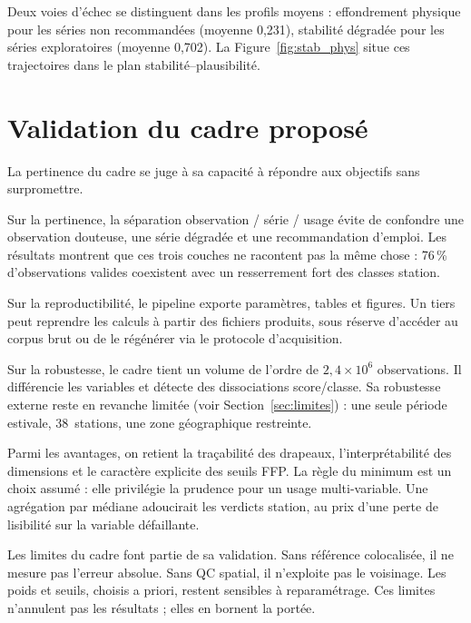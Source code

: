 Deux voies d'échec se distinguent dans les profils moyens : effondrement
physique pour les séries non recommandées (moyenne 0,231), stabilité dégradée
pour les séries exploratoires (moyenne 0,702). La Figure~\ref{fig:stab_phys}
situe ces trajectoires dans le plan stabilité--plausibilité.

\section{Validation du cadre proposé}
\label{sec:validation}

La pertinence du cadre se juge à sa capacité à répondre aux objectifs sans
surpromettre.

Sur la pertinence, la séparation observation / série / usage évite de confondre
une observation douteuse, une série dégradée et une recommandation d'emploi.
Les résultats montrent que ces trois couches ne racontent pas la même chose :
76\,\% d'observations valides coexistent avec un resserrement fort des classes
station.

Sur la reproductibilité, le pipeline exporte paramètres, tables et figures. Un
tiers peut reprendre les calculs à partir des fichiers produits, sous réserve
d'accéder au corpus brut ou de le régénérer via le protocole d'acquisition.

Sur la robustesse, le cadre tient un volume de l'ordre de
$2,4 \times 10^6$ observations. Il différencie les variables et détecte des
dissociations score/classe. Sa robustesse externe reste en revanche limitée
(voir Section~\ref{sec:limites}) : une seule période estivale, 38~stations, une
zone géographique restreinte.

Parmi les avantages, on retient la traçabilité des drapeaux, l'interprétabilité
des dimensions et le caractère explicite des seuils FFP. La règle du minimum
est un choix assumé : elle privilégie la prudence pour un usage multi-variable.
Une agrégation par médiane adoucirait les verdicts station, au prix d'une perte
de lisibilité sur la variable défaillante.

Les limites du cadre font partie de sa validation. Sans référence colocalisée,
il ne mesure pas l'erreur absolue. Sans QC spatial, il n'exploite pas le
voisinage. Les poids et seuils, choisis a priori, restent sensibles à
reparamétrage. Ces limites n'annulent pas les résultats ; elles en bornent la
portée.

